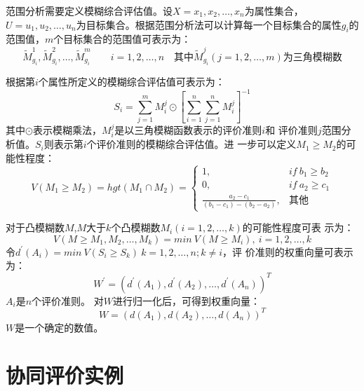 \documentclass[adobefonts,UTF8]{ctexart}
\begin{document}
范围分析需要定义模糊综合评估值。设$X={x_1,x_2,\ldots,x_n}$为属性集合，$U={u_1,u_2,\ldots,u_n}$为目标集合。根据范围分析法可以计算每一个目标集合的属性$g_i$的范围值，$m$个目标集合的范围值可表示为：
\[
\tilde{M}^1_{g_i},\tilde{M}^2_{g_i},\ldots,\tilde{M}^m_{g_i} \qquad i=1,2,\ldots,n \quad \text{其中}\tilde{M}^j_{g_i}(j=1,2,\ldots,m)\text{为三角模糊数}
\]

根据第$i$个属性所定义的模糊综合评估值可表示为：
\[
S_i=\sum^m_{j=1}M^j_{i}\odot
\left[\sum_{i=1}^n\sum_{j=1}^nM_{i}^j\right]^{-1}
\]
其中$\odot$表示模糊乘法，$M_{i}^j$是以三角模糊函数表示的评价准则$i$和
评价准则$j$范围分析值。$S_i$则表示第$i$个评价准则的模糊综合评估值。进
一步可以定义$M_1\geq M_2$的可能性程度：
\[V(M_1 \geq M_2)= hgt(M_1\cap M_2)=
\left\{
    \begin{array}{lll}
      1,& if \ b_1 \geq b_2\\
      0,& if \ a_2 \geq c_1\\
      \frac{a_2-c_1}{(b_1-c_1)-(b_2-a_2)},&\mbox{其他}
    \end{array}
  \right.
\]

对于凸模糊数$M$,$M$大于$k$个凸模糊数$M_i(i=1,2,\ldots,k)$的可能性程度可表
示为：
\[
V(M \geq M_1,M_2,\ldots,M_k)=min \ V(M \geq M_i),\ i=1,2,\ldots,k 
\]
令$d^{'} (A_i)=min \ V(S_i \geq S_k) \ k=1,2,\ldots,n; k \not= i$，评
价准则的权重向量可表示为：
\[
W^{'}=(d^{'}(A_1),d^{'}(A_2),\ldots,d^{'}(A_n))^T
\]
$A_i$是$n$个评价准则。
对$W$进行归一化后，可得到权重向量：
\[
W=(d(A_1),d(A_2),\ldots,d(A_n))^T
\]
$W$是一个确定的数值。

\section{协同评价实例}
\end{document}
